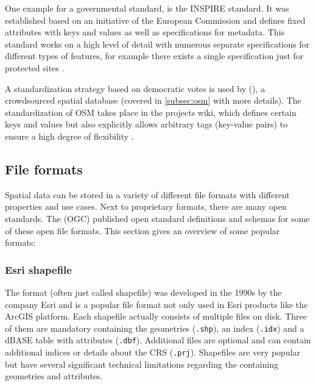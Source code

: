 			One example for a governmental standard, is the INSPIRE standard.
			It was established based on an initiative of the European Commission and defines fixed attributes with keys and values as well as specifications for metadata.
			This standard works on a high level of detail with numerous separate specifications for different types of features, for example there exists a single specification just for protected sites \cite[31]{inspire-protected-sites}.
		
			A standardization strategy based on democratic votes is used by  (), a crowdsourced spatial database (covered in \cref{subsec:osm} with more details).
			The standardization of OSM takes place in the projects wiki, which defines certain keys and values but also explicitly allows arbitrary tags (key-value pairs) to ensure a high degree of flexibility \cite{osm-wiki-proposal-process}.
			
	\subsection{File formats}
	\label{subsec:file-formats}
	
		Spatial data can be stored in a variety of different file formats with different properties and use cases.
		Next to proprietary formats, there are many open standards.
		The  (OGC) published open standard definitions and schemas for some of these open file formats.		
		This section gives an overview of some popular formats:
		
		\subsubsection{Esri shapefile}
		\label{subsubsec:shapefile}
		
			The  format (often just called shapefile) was developed in the 1990s by the company Esri and is a popular file format not only used in Esri products like the ArcGIS platform.
			Each shapefile actually consists of multiple files on disk\cite{esri-shapefile-file-ext-spec}.
			Three of them are mandatory containing the geometries (\texttt{.shp}), an index (\texttt{.idx}) and a dBASE table with attributes (\texttt{.dbf}).
			Additional files are optional and can contain additional indices or details about the CRS (\texttt{.prj}).
			Shapefiles are very popular\cite{spatial-file-formats-trends} but have several significant technical limitations regarding the containing geometries and attributes.
			

